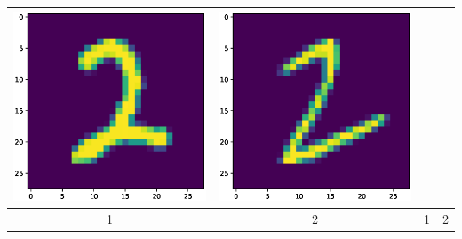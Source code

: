 \documentclass{article}
\begin{document}
\begin{tabular}{cccc}
\includegraphics[scale=.1]{fig/MNIST_947_1_2_806_2.eps}&
\includegraphics[scale=.1]{fig/MNIST_947_1_3_13_2.eps}
\\ \hline
1 & 2 & 1 & 2 \\


\end{tabular}
\end{document}
